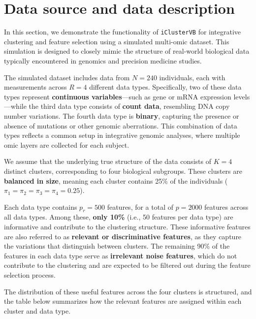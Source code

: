 
\section{Data source and data description}

In this section, we demonstrate the functionality of \texttt{iClusterVB} for integrative clustering and feature selection using a simulated multi-omic dataset. This simulation is designed to closely mimic the structure of real-world biological data typically encountered in genomics and precision medicine studies.

The simulated dataset includes data from \( N = 240 \) individuals, each with measurements across \( R = 4 \) different data types. Specifically, two of these data types represent \textbf{continuous variables}---such as gene or mRNA expression levels---while the third data type consists of \textbf{count data}, resembling DNA copy number variations. The fourth data type is \textbf{binary}, capturing the presence or absence of mutations or other genomic aberrations. This combination of data types reflects a common setup in integrative genomic analyses, where multiple omic layers are collected for each subject.

We assume that the underlying true structure of the data consists of \( K = 4 \) distinct clusters, corresponding to four biological subgroups. These clusters are \textbf{balanced in size}, meaning each cluster contains 25\% of the individuals (\( \pi_1 = \pi_2 = \pi_3 = \pi_4 = 0.25 \)).

Each data type contains \( p_r = 500 \) features, for a total of \( p = 2000 \) features across all data types. Among these, \textbf{only 10\%} (i.e., 50 features per data type) are informative and contribute to the clustering structure. These informative features are also referred to as \textbf{relevant or discriminative features}, as they capture the variations that distinguish between clusters. The remaining 90\% of the features in each data type serve as \textbf{irrelevant noise features}, which do not contribute to the clustering and are expected to be filtered out during the feature selection process.

The distribution of these useful features across the four clusters is structured, and the table below summarizes how the relevant features are assigned within each cluster and data type.

